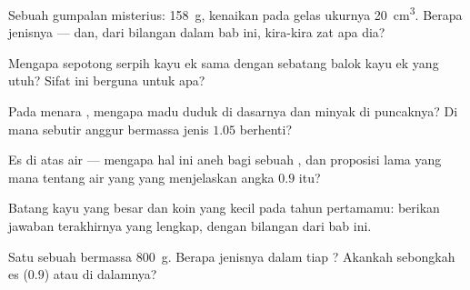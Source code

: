 \begin{exercise}[$\star$]\label{exo:g6:density-floating:4}
Sebuah gumpalan misterius:  \qty{158}{g}, kenaikan pada gelas
ukurnya \qty{20}{cm^3}. Berapa  jenisnya --- dan, dari bilangan
dalam bab ini, kira-kira zat apa dia?
\end{exercise}

\begin{exercise}[$\star$]\label{exo:g6:density-floating:5}
Mengapa  sepotong serpih kayu ek sama dengan 
sebatang balok kayu ek yang utuh? Sifat ini berguna untuk apa?
\end{exercise}

\begin{exercise}[$\star$]\label{exo:g6:density-floating:6}
Pada menara , mengapa madu duduk di dasarnya dan minyak di
puncaknya? Di mana sebutir anggur bermassa jenis $1.05$ berhenti?
\end{exercise}

\begin{exercise}[$\star$]\label{exo:g6:density-floating:7}
Es  di atas air --- mengapa hal ini aneh bagi sebuah , dan proposisi lama yang mana tentang air yang  yang
menjelaskan angka $0.9$ itu?
\end{exercise}

\begin{exercise}[$\star$]\label{exo:g6:density-floating:8}
Batang kayu yang besar dan koin yang kecil pada tahun pertamamu:
berikan jawaban terakhirnya yang lengkap, dengan bilangan dari bab
ini.
\end{exercise}

\begin{exercise}[$\star\star$]\label{exo:g6:density-floating:9}
Satu  sebuah  bermassa \qty{800}{g}. Berapa 
jenisnya dalam  tiap ? Akankah sebongkah es
($0.9$)  atau  di dalamnya?
\end{exercise}

